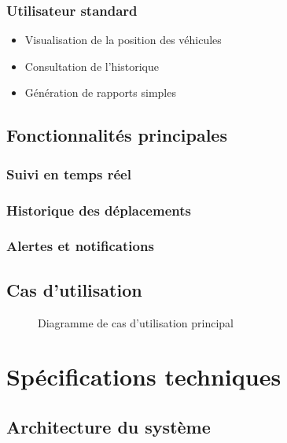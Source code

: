 \documentclass[12pt,a4paper]{article}
\begin{document}
\subsubsection{Utilisateur standard}
\begin{itemize}
    \item Visualisation de la position des véhicules
    \item Consultation de l'historique
    \item Génération de rapports simples
\end{itemize}

\subsection{Fonctionnalités principales}

\subsubsection{Suivi en temps réel}
\lipsum[6]

\subsubsection{Historique des déplacements}
\lipsum[7]

\subsubsection{Alertes et notifications}
\lipsum[8]

\subsection{Cas d'utilisation}

\begin{figure}[h]
\centering
\caption{Diagramme de cas d'utilisation principal}
\end{figure}

\section{Spécifications techniques}

\subsection{Architecture du système}
\end{document}
